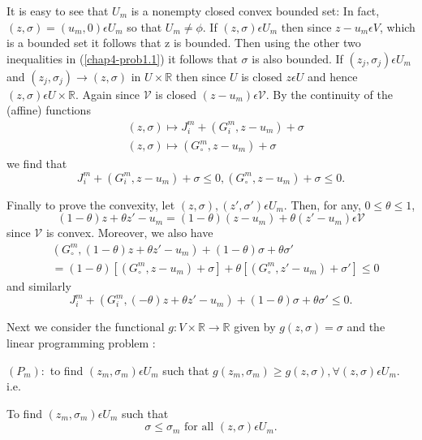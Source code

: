 It is easy to see that $U_{m}$ is a nonempty closed convex bounded set: In fact, $(z, \sigma) = (u_{m}, 0) \epsilon U_{m}$ so that $U_{m} \neq \phi$. If $(z, \sigma) \epsilon U_{m}$ then since $z-u_{m} \epsilon V$, which is a bounded set it follows that z is bounded. Then using the other two inequalities in (\ref{chap4-prob1.1}) it follows that $\sigma$ is also bounded. If $(z_{j}, \sigma_{j}) \epsilon U_{m}$ and $(z_{j}, \sigma_{j}) \to (z, \sigma)$ in $U \times \mathbb{R}$ then since $U$ is closed $z \epsilon U$ and hence $(z, \sigma) \epsilon U \times \mathbb{R}$. Again since $\mathscr{V}$ is closed $(z-u_{m}) \epsilon \mathscr{V}$. By the continuity of the (affine) functions
\begin{align*}
& (z, \sigma) \mapsto J_{i}^{m} + (G_{i}^{m}, z-u_{m}) + \sigma\\
& (z, \sigma) \mapsto (G_{\circ}^{m}, z-u_{m}) + \sigma
\end{align*}\pageoriginale
we find that
$$
J_{i}^{m} + (G_{i}^{m}, z-u_{m}) + \sigma \leq 0, (G_{\circ}^{m}, z-u_{m}) + \sigma \leq 0.
$$

Finally to prove the convexity, let $(z, \sigma), (z', \sigma') \epsilon U_{m}$. Then, for any, $0 \leq \theta \leq 1$,
$$
(1-\theta) z + \theta z' - u_{m} = (1-\theta)(z-u_{m}) + \theta (z'-u_{m}) \epsilon \mathscr{V}
$$
since $\mathscr{V}$ is convex. Moreover, we also have
\begin{align*}
& (G_{\circ}^{m}, (1-\theta) z + \theta z' -u_{m}) + (1-\theta) \sigma + \theta \sigma'\\
& = (1-\theta) [(G_{\circ}^{m}, z-u_{m}) + \sigma] + \theta [(G_{\circ}^{m}, z'-u_{m}) + \sigma'] \leq 0 
\end{align*}
and similarly
$$
J_{i}^{m} + (G_{i}^{m}, (-\theta) z + \theta z' - u_{m}) + (1-\theta) \sigma + \theta \sigma' \leq 0.
$$

Next we consider the functional $g : V \times \mathbb{R} \to \mathbb{R}$ given by $g(z, \sigma) = \sigma$ and the linear programming problem :

$(P_{m}):$ to find $(z_{m}, \sigma_{m}) \epsilon U_{m}$ such that $g(z_{m}, \sigma_{m}) \geq g(z, \sigma), \forall (z, \sigma) \epsilon U_{m}$. i.e.

\medskip
{} To find $(z_{m}, \sigma_{m}) \epsilon U_{m}$ such that
\begin{equation*}
\sigma \leq \sigma_{m} \text{ for all } (z, \sigma) \epsilon U_{m}.\tag{1.2}\label{chap4-eq1.2}
\end{equation*}

